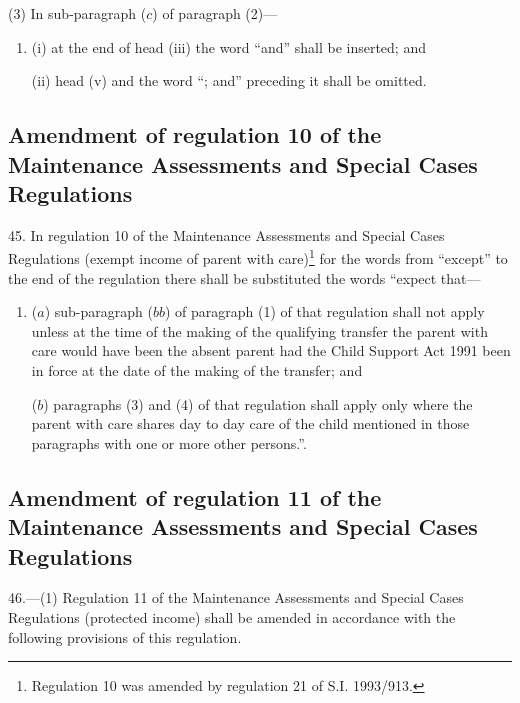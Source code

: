 \documentclass[a4paper]{article}
\begin{document}
(3) In sub-paragraph ($c$) of paragraph (2)—
\begin{enumerate}\item[]
(i) at the end of head (iii) the word “and” shall be inserted; and

(ii) head (v) and the word “; and” preceding it shall be omitted.
\end{enumerate}

\subsection[45. Amendment of regulation 10 of the Maintenance Assessments and Special Cases Regulations]{Amendment of regulation 10 of the Maintenance Assessments and Special Cases Regulations}

45.  In regulation 10 of the Maintenance Assessments and Special Cases Regulations (exempt income of parent with care)\footnote{\frenchspacing Regulation 10 was amended by regulation 21 of S.I. 1993/913.} for the words from “except” to the end of the regulation there shall be substituted the words “expect that—
\begin{enumerate}\item[]
($a$) sub-paragraph ($bb$) of paragraph (1) of that regulation shall not apply unless at the time of the making of the qualifying transfer the parent with care would have been the absent parent had the Child Support Act 1991 been in force at the date of the making of the transfer; and

($b$) paragraphs (3) and (4) of that regulation shall apply only where the parent with care shares day to day care of the child mentioned in those paragraphs with one or more other persons.”.
\end{enumerate}

\subsection[46. Amendment of regulation 11 of the Maintenance Assessments and Special Cases Regulations]{Amendment of regulation 11 of the Maintenance Assessments and Special Cases Regulations}

46.—(1) Regulation 11 of the Maintenance Assessments and Special Cases Regulations (protected income) shall be amended in accordance with the following provisions of this regulation.
\end{document}
